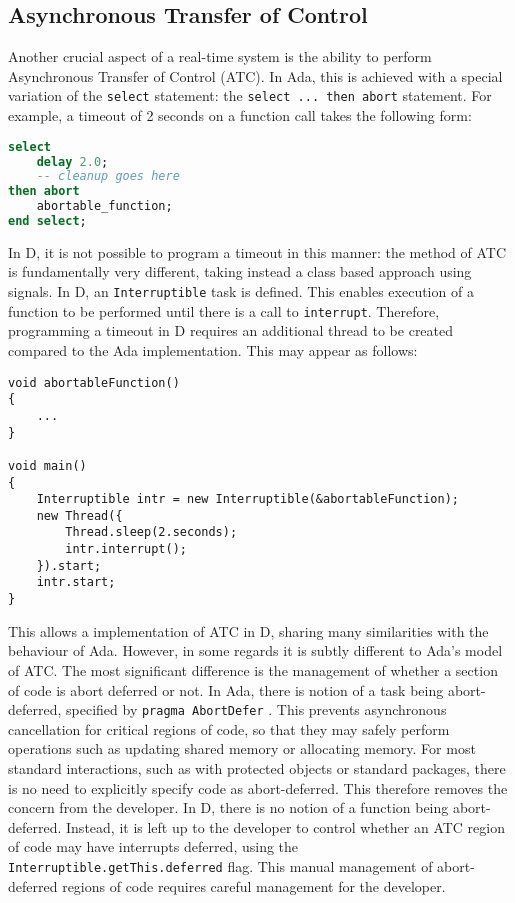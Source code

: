 \subsection{Asynchronous Transfer of Control}
Another crucial aspect of a real-time system is the ability to perform
Asynchronous Transfer of Control (ATC). In Ada, this is achieved with a special
variation of the \texttt{select} statement: the \texttt{select ... then abort}
statement. For example, a timeout of 2 seconds on a function call takes the 
following form: 
\begin{lstlisting}[basicstyle=\small,language=Ada]
select 
    delay 2.0; 
    -- cleanup goes here 
then abort
    abortable_function; 
end select; 
\end{lstlisting}
In D, it is not possible to program a timeout in this manner: the method of ATC
is fundamentally very different, taking instead a class based approach using 
signals. In D, an \texttt{Interruptible} task is defined. This enables
execution of a function to be performed until there is a call to
\texttt{interrupt}. Therefore, programming a timeout in D requires an additional
thread to be created compared to the Ada implementation. This may appear as follows: 
\begin{lstlisting}[basicstyle=\small]
void abortableFunction()
{
    ...
}

void main()
{
    Interruptible intr = new Interruptible(&abortableFunction); 
    new Thread({
        Thread.sleep(2.seconds); 
        intr.interrupt(); 
    }).start;
    intr.start; 
}
\end{lstlisting}
This allows a implementation of ATC in D, sharing many similarities with the
behaviour of Ada. However, in some regards it is subtly different to 
Ada's model of ATC. The most significant difference is the management of
whether a section of code is abort deferred or not. In Ada, there is notion of
a task being abort-deferred, specified by \texttt{pragma Abort\textunderscore{}Defer}
\cite{atc-article}.
This prevents asynchronous cancellation for
critical regions of code, so that they may safely perform operations such as
updating shared memory or allocating memory. 
For most standard interactions, such as with protected objects or standard
packages, there is no need to explicitly specify code as abort-deferred. This
therefore removes the concern from the developer. In D, there is no notion of a
function being abort-deferred. Instead, it is left up to the developer to
control whether an ATC region of code may have interrupts deferred, using the 
\texttt{Interruptible.getThis.deferred} flag. This manual management of
abort-deferred regions of code requires careful management for the developer. 

